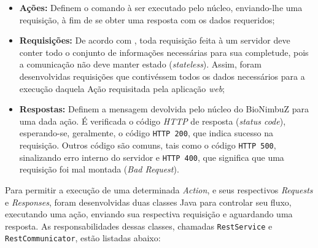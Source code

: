 \begin{itemize}
	\item \textbf{Ações:} Definem o comando à ser executado pelo núcleo, enviando-lhe uma requisição, à fim de se obter uma resposta com os dados requeridos;
	\item \textbf{Requisições:} De acordo com \cite{rest}, toda requisição feita à um servidor deve conter todo o conjunto de informações necessárias para sua completude, pois a comunicação não deve manter estado (\textit{stateless}). Assim, foram desenvolvidas requisições que contivéssem todos os dados necessários para a execução daquela Ação requisitada pela aplicação \textit{web};
	\item \textbf{Respostas:} Definem a mensagem devolvida pelo núcleo do BioNimbuZ para uma dada ação. É verificada o código \textit{HTTP} de resposta (\textit{status code}), esperando-se, geralmente, o código \texttt{HTTP 200}, que indica sucesso na requisição. Outros código são comuns, tais como o código \texttt{HTTP 500}, sinalizando erro interno do servidor e \texttt{HTTP 400}, que significa que uma requisição foi mal montada (\textit{Bad Request}).
\end{itemize} 

Para permitir a execução de uma determinada \textit{Action}, e seus respectivos \textit{Requests} e \textit{Responses}, foram desenvolvidas duas classes Java para controlar seu fluxo, executando uma ação, enviando sua respectiva requisição e aguardando uma resposta. As responsabilidades dessas classes, chamadas \texttt{RestService} e \texttt{RestCommunicator}, estão listadas abaixo:

